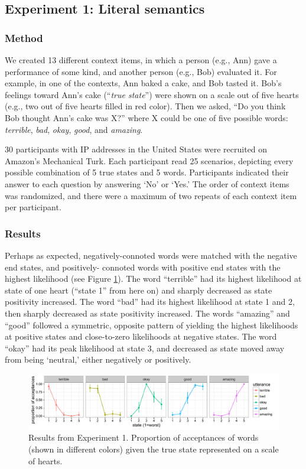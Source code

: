 \documentclass[10pt,letterpaper]{article}
\begin{document}
\subsection{Experiment 1: Literal semantics}

\subsubsection{Method}

We created 13 different context items, in which a person (e.g., Ann) gave a performance of some kind, and another person (e.g., Bob) evaluated it. For example, in one of the contexts, Ann baked a cake, and Bob tasted it. Bob's feelings toward Ann's cake (``\emph{true state}'') were shown on a scale out of five hearts (e.g., two out of five hearts filled in red color). Then we asked, ``Do you think Bob thought Ann's cake was X?'' where X could be one of five possible words: \emph{terrible}, \emph{bad}, \emph{okay}, \emph{good}, and \emph{amazing}.

30 participants with IP addresses in the United States were recruited on Amazon's Mechanical Turk. Each participant read 25 scenarios, depicting every possible combination of 5 true states and 5 words. Participants indicated their answer to each question by answering `No' or `Yes.' The order of context items was randomized, and there were a maximum of two repeats of each context item per participant.

\subsubsection{Results}

Perhaps as expected, negatively-connoted words were matched with the negative end states, and positively- connoted words with positive end states with the highest likelihood (see Figure \ref{fig:exp1}). The word ``terrible'' had its highest likelihood at state of one heart (``state 1'' from here on) and sharply decreased as state positivity increased. The word ``bad'' had its highest likelihood at state 1 and 2, then sharply decreased as state positivity increased. The words ``amazing'' and ``good'' followed a symmetric, opposite pattern of yielding the highest likelihoods at positive states and close-to-zero likelihoods at negative states. The word ``okay'' had its peak likelihood at state 3, and decreased as state moved away from being ‘neutral,' either negatively or positively.

\begin{figure}[t]
\begin{center} 
  \includegraphics[width=.9\textwidth]{figures/exp1.pdf}
  \caption{\label{fig:exp1} Results from Experiment 1. Proportion of acceptances of words (shown in different colors) given the true state represented on a scale of hearts.}
  \end{center} 
\end{figure}
\end{document}
